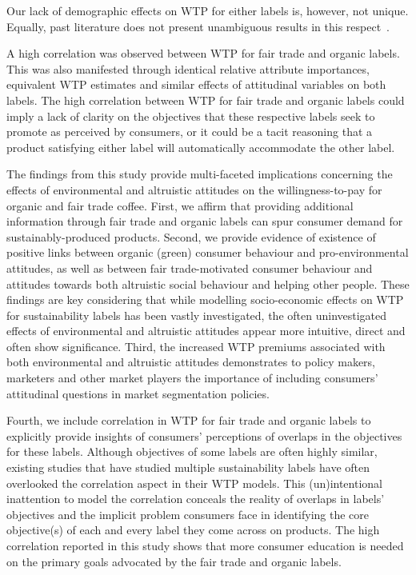 \documentclass[sustainability,article,accept,moreauthors,pdftex,10pt,a4paper]{Definitions/mdpi}
\theoremstyle{mdpi}
\newcounter{ex}
\newcounter{re}
\theoremstyle{mdpidefinition}
\begin{document}
{\par{Our lack of demographic effects on WTP for either labels is, however, not unique. Equally, past literature does not present unambiguous results in this respect~\cite{Laroche2001,DePelsmacker2005,Krystallis2005,Langen2013}.}
\par{A high correlation was observed between WTP for fair trade and organic labels. This was also manifested through identical relative attribute importances, equivalent WTP estimates and similar effects of attitudinal variables on both labels. The high correlation between WTP for fair trade and organic labels could imply a lack of clarity on the objectives that these respective labels seek to promote as perceived by consumers, or it could be a tacit reasoning that a product satisfying either label will automatically accommodate the other label.}
\par{The findings from this study provide multi-faceted implications concerning the effects of environmental and altruistic attitudes on the willingness-to-pay for organic and fair trade coffee. First, we affirm that providing additional information through fair trade and organic labels can spur consumer demand for sustainably-produced products. Second, we provide evidence of existence of positive links between organic (green) consumer behaviour and pro-environmental attitudes, as well as  between fair trade-motivated consumer behaviour and attitudes towards both altruistic social behaviour and helping other people. These findings are key considering that while modelling socio-economic effects on WTP for sustainability labels has been vastly investigated, the often uninvestigated effects of environmental and altruistic attitudes appear more intuitive, direct and often show significance. Third, the increased WTP premiums associated with both environmental and altruistic attitudes demonstrates to policy makers, marketers and other market players the importance of including consumers’ attitudinal questions in market segmentation policies. }
\par{Fourth, we include correlation in WTP for fair trade and organic labels to explicitly provide insights of consumers’ perceptions of overlaps in the objectives for these labels. Although objectives of some labels are often highly similar, existing studies that have studied multiple sustainability labels have often overlooked the correlation aspect in their WTP models. This (un)intentional inattention to model the correlation conceals the reality of overlaps in labels’ objectives and the implicit problem consumers face in identifying the core objective(s) of each and every label they come across on products. The high correlation reported in this study shows that more consumer education  is needed on the primary goals advocated by the fair trade and organic labels.}
}
\end{document}
